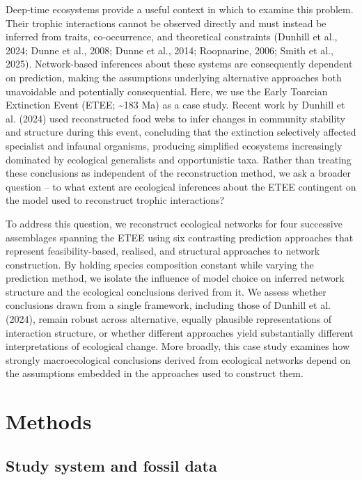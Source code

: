 \documentclass[
]{article}
\begin{document}
Deep-time ecosystems provide a useful context in which to examine this
problem. Their trophic interactions cannot be observed directly and must
instead be inferred from traits, co-occurrence, and theoretical
constraints (Dunhill et al., 2024; Dunne et al., 2008; Dunne et al.,
2014; Roopnarine, 2006; Smith et al., 2025). Network-based inferences
about these systems are consequently dependent on prediction, making the
assumptions underlying alternative approaches both unavoidable and
potentially consequential. Here, we use the Early Toarcian Extinction
Event (ETEE; \textasciitilde183 Ma) as a case study. Recent work by
Dunhill et al. (2024) used reconstructed food webs to infer changes in
community stability and structure during this event, concluding that the
extinction selectively affected specialist and infaunal organisms,
producing simplified ecosystems increasingly dominated by ecological
generalists and opportunistic taxa. Rather than treating these
conclusions as independent of the reconstruction method, we ask a
broader question -- to what extent are ecological inferences about the
ETEE contingent on the model used to reconstruct trophic interactions?

To address this question, we reconstruct ecological networks for four
successive assemblages spanning the ETEE using six contrasting
prediction approaches that represent feasibility-based, realised, and
structural approaches to network construction. By holding species
composition constant while varying the prediction method, we isolate the
influence of model choice on inferred network structure and the
ecological conclusions derived from it. We assess whether conclusions
drawn from a single framework, including those of Dunhill et al. (2024),
remain robust across alternative, equally plausible representations of
interaction structure, or whether different approaches yield
substantially different interpretations of ecological change. More
broadly, this case study examines how strongly macroecological
conclusions derived from ecological networks depend on the assumptions
embedded in the approaches used to construct them.

\section{Methods}\label{methods}

\subsection{Study system and fossil
data}\label{study-system-and-fossil-data}
\end{document}
